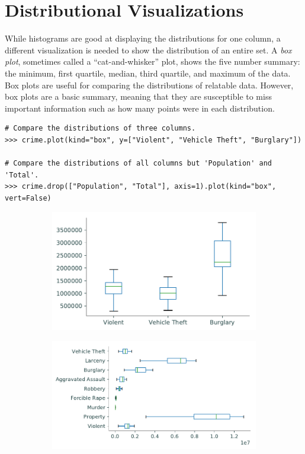 \section*{Distributional Visualizations} %

While histograms are good at displaying the distributions for one column, a different visualization is needed to show the distribution of an entire set.
A \emph{box plot}, sometimes called a ``cat-and-whisker'' plot, shows the five number summary: the minimum, first quartile, median, third quartile, and maximum of the data.
Box plots are useful for comparing the distributions of relatable data.
However, box plots are a basic summary, meaning that they are susceptible to  miss important information such as how many points were in each distribution.

\begin{lstlisting}
# Compare the distributions of three columns.
>>> crime.plot(kind="box", y=["Violent", "Vehicle Theft", "Burglary"])

# Compare the distributions of all columns but 'Population' and 'Total'.
>>> crime.drop(["Population", "Total"], axis=1).plot(kind="box", vert=False)
\end{lstlisting}

\begin{figure}[H] %
\captionsetup[subfigure]{justification=centering}
\centering
\begin{subfigure}{.49\textwidth}
    \includegraphics[width=\textwidth]{figures/box_small.pdf}
\end{subfigure}
%
\begin{subfigure}{.49\textwidth}
    \includegraphics[width=\textwidth]{figures/box_large.pdf}
\end{subfigure}
\end{figure}

